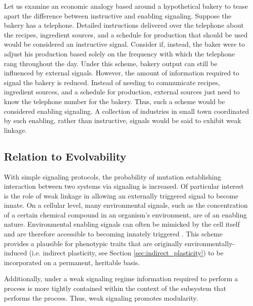 Let us examine an economic analogy based around a hypothetical bakery to tease apart the difference between instructive and enabling signaling.
Suppose the bakery has a telephone.
Detailed instructions delivered over the telephone about the recipes, ingredient sources, and a schedule for production that should be used would be considered an instructive signal.
Consider if, instead, the baker were to adjust his production based solely on the frequency with which the telephone rang throughout the day.
Under this scheme, bakery output can still be influenced by external signals.
However, the amount of information required to signal the bakery is reduced.
Instead of needing to communicate recipes, ingredient sources, and a schedule for production, external sources just need to know the telephone number for the bakery.
Thus, such a scheme would be considered enabling signaling.
A collection of industries in small town coordinated by such enabling, rather than instructive, signals would be said to exhibit weak linkage.

\subsection{Relation to Evolvability}
With simple signaling protocols, the probability of mutation establishing interaction between two systems via signaling is increased.
Of particular interest is the role of weak linkage in allowing an externally triggered signal to become innate.
On a cellular level, many environmental signals, such as the concentration of a certain chemical compound in an organism's environment, are of an enabling nature.
Environmental enabling signals can often be mimicked by the cell itself and are therefore accessible to becoming innately triggered \cite[p 210]{Downing2015IntelligenceSystems}.
This scheme provides a plausible for phenotypic traits that are originally environmentally-induced (i.e. indirect plasticity, see Section \ref{sec:indirect_plasticity}) to be incorporated on a permanent, heritable basis.

Additionally, under a weak signaling regime information required to perform a process is more tightly contained within the context of the subsystem that performs the process.
Thus, weak signaling promotes modularity.

